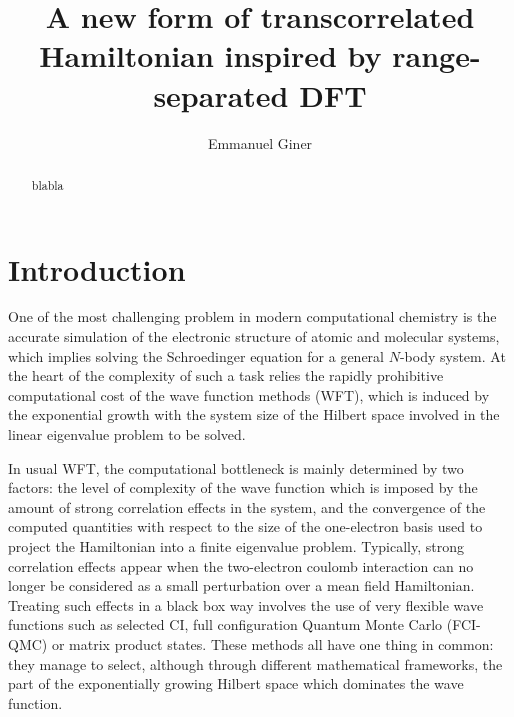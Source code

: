 \documentclass[aip,jcp,reprint,noshowkeys,superscriptaddress]{revtex4-1}
\begin{document}
	

\title{A new form of transcorrelated Hamiltonian inspired by range-separated DFT}

\author{Emmanuel Giner}

\begin{abstract}
blabla

\end{abstract}

\maketitle
\section{Introduction}
One of the most challenging problem in modern computational chemistry is the accurate simulation of the electronic structure of atomic and molecular systems, which implies solving the Schroedinger equation for a general $N$-body system. 
At the heart of the complexity of such a task relies the rapidly prohibitive computational cost of the wave function methods (WFT), which is induced by the exponential growth with the system size of the Hilbert space involved in the linear eigenvalue problem to be solved. 

In usual WFT, the computational bottleneck is mainly determined by two factors: the level of complexity of the wave function which is imposed by the amount of strong correlation effects in the system, and the convergence of the computed quantities with respect to the size of the one-electron basis used to project the Hamiltonian into a finite eigenvalue problem. 
Typically, strong correlation effects appear when the two-electron coulomb interaction can no longer be considered as a small perturbation over a mean field Hamiltonian. Treating such effects in a black box way involves the use of very flexible wave functions such as 
selected CI\cite{HurMalRan-JCP-73,bender,malrieu,buenker1,buenker-book,three_class_CIPSI,harrison,GinSceCaf-CJC-13, GinSceCaf-JCP-15, ShaHolJeaAlaUmr-JCTC-17}, 
full configuration Quantum Monte Carlo\cite{BooThoAla-JCP-09,BooAla-JCP-10,BooCleThoAla-JCP-11,GhaLozAla-JCP-19,VitAlaKat-JCTC-20} (FCI-QMC) or matrix product states\cite{ChaSha-AR-11,BaiRei-JCP-20}. These methods all have one thing in common: they manage to select, although through different mathematical frameworks, the part of the exponentially growing Hilbert space which dominates the wave function. 
\end{document}
